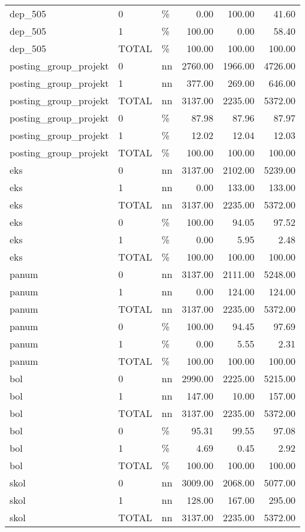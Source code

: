 \begin{longtable}[t]{lllrrr}
dep\_505 & 0 & \% & 0.00 & 100.00 & 41.60\\
dep\_505 & 1 & \% & 100.00 & 0.00 & 58.40\\
dep\_505 & TOTAL & \% & 100.00 & 100.00 & 100.00\\
posting\_group\_projekt & 0 & nn & 2760.00 & 1966.00 & 4726.00\\
posting\_group\_projekt & 1 & nn & 377.00 & 269.00 & 646.00\\
posting\_group\_projekt & TOTAL & nn & 3137.00 & 2235.00 & 5372.00\\
posting\_group\_projekt & 0 & \% & 87.98 & 87.96 & 87.97\\
posting\_group\_projekt & 1 & \% & 12.02 & 12.04 & 12.03\\
posting\_group\_projekt & TOTAL & \% & 100.00 & 100.00 & 100.00\\
eks & 0 & nn & 3137.00 & 2102.00 & 5239.00\\
eks & 1 & nn & 0.00 & 133.00 & 133.00\\
eks & TOTAL & nn & 3137.00 & 2235.00 & 5372.00\\
eks & 0 & \% & 100.00 & 94.05 & 97.52\\
eks & 1 & \% & 0.00 & 5.95 & 2.48\\
eks & TOTAL & \% & 100.00 & 100.00 & 100.00\\
panum & 0 & nn & 3137.00 & 2111.00 & 5248.00\\
panum & 1 & nn & 0.00 & 124.00 & 124.00\\
panum & TOTAL & nn & 3137.00 & 2235.00 & 5372.00\\
panum & 0 & \% & 100.00 & 94.45 & 97.69\\
panum & 1 & \% & 0.00 & 5.55 & 2.31\\
panum & TOTAL & \% & 100.00 & 100.00 & 100.00\\
bol & 0 & nn & 2990.00 & 2225.00 & 5215.00\\
bol & 1 & nn & 147.00 & 10.00 & 157.00\\
bol & TOTAL & nn & 3137.00 & 2235.00 & 5372.00\\
bol & 0 & \% & 95.31 & 99.55 & 97.08\\
bol & 1 & \% & 4.69 & 0.45 & 2.92\\
bol & TOTAL & \% & 100.00 & 100.00 & 100.00\\
skol & 0 & nn & 3009.00 & 2068.00 & 5077.00\\
skol & 1 & nn & 128.00 & 167.00 & 295.00\\
skol & TOTAL & nn & 3137.00 & 2235.00 & 5372.00\\

\end{longtable}
